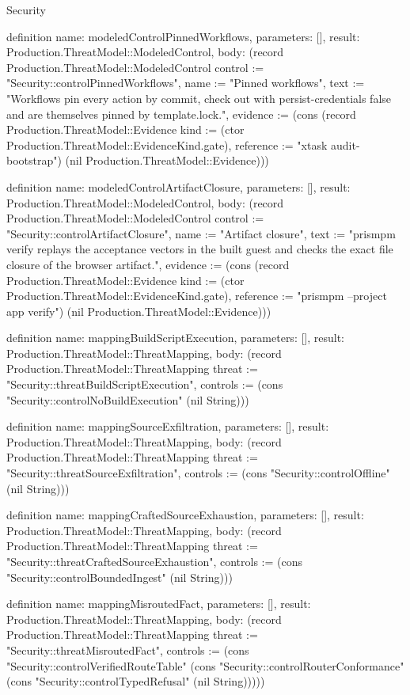 \begin{lexlean}{Security}
\begin{semanticmodule}
{{definition{
  name: modeledControlPinnedWorkflows,
  parameters: [],
  result: Production.ThreatModel::ModeledControl,
  body: (record Production.ThreatModel::ModeledControl {control := "Security::controlPinnedWorkflows", name := "Pinned workflows", text := "Workflows pin every action by commit, check out with persist-credentials false and are themselves pinned by template.lock.", evidence := (cons (record Production.ThreatModel::Evidence {kind := (ctor Production.ThreatModel::EvidenceKind.gate), reference := "xtask audit-bootstrap"}) (nil Production.ThreatModel::Evidence))})
}

definition{
  name: modeledControlArtifactClosure,
  parameters: [],
  result: Production.ThreatModel::ModeledControl,
  body: (record Production.ThreatModel::ModeledControl {control := "Security::controlArtifactClosure", name := "Artifact closure", text := "prismpm verify replays the acceptance vectors in the built guest and checks the exact file closure of the browser artifact.", evidence := (cons (record Production.ThreatModel::Evidence {kind := (ctor Production.ThreatModel::EvidenceKind.gate), reference := "prismpm --project app verify"}) (nil Production.ThreatModel::Evidence))})
}

definition{
  name: mappingBuildScriptExecution,
  parameters: [],
  result: Production.ThreatModel::ThreatMapping,
  body: (record Production.ThreatModel::ThreatMapping {threat := "Security::threatBuildScriptExecution", controls := (cons "Security::controlNoBuildExecution" (nil String))})
}

definition{
  name: mappingSourceExfiltration,
  parameters: [],
  result: Production.ThreatModel::ThreatMapping,
  body: (record Production.ThreatModel::ThreatMapping {threat := "Security::threatSourceExfiltration", controls := (cons "Security::controlOffline" (nil String))})
}

definition{
  name: mappingCraftedSourceExhaustion,
  parameters: [],
  result: Production.ThreatModel::ThreatMapping,
  body: (record Production.ThreatModel::ThreatMapping {threat := "Security::threatCraftedSourceExhaustion", controls := (cons "Security::controlBoundedIngest" (nil String))})
}

definition{
  name: mappingMisroutedFact,
  parameters: [],
  result: Production.ThreatModel::ThreatMapping,
  body: (record Production.ThreatModel::ThreatMapping {threat := "Security::threatMisroutedFact", controls := (cons "Security::controlVerifiedRouteTable" (cons "Security::controlRouterConformance" (cons "Security::controlTypedRefusal" (nil String))))})
}

}}
\end{semanticmodule}
\end{lexlean}
